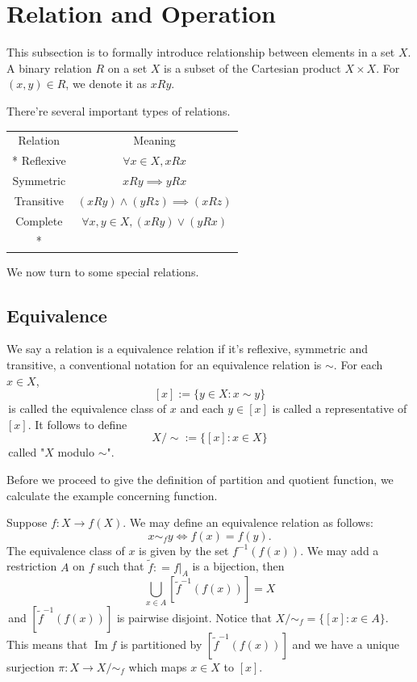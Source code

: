 \section{Relation and Operation}
This subsection is to formally introduce relationship between elements in a set $X$. A binary relation $R$ on a set $X$ is a subset of the Cartesian product $X\times X$. 
For $(x,y) \in R$, we denote it as $xRy$.

There're several important types of relations.
\begin{longtable}[c]{@{}cc@{}}
\toprule
Relation   & Meaning                             \\* \midrule
\endfirsthead
%
\endhead
%
\bottomrule
\endfoot
%
\endlastfoot
%
Reflexive  & $\forall x \in X, xRx$                \\
Symmetric  & $xRy \implies yRx$                    \\
Transitive & $(xRy) \land (yRz) \implies (xRz)$    \\
Complete   & $\forall x,y \in X, (xRy) \lor (yRx)$ \\* \bottomrule
\end{longtable}

We now turn to some special relations.
\subsection{Equivalence}
We say a relation is a equivalence relation if it's reflexive, symmetric and transitive, a conventional notation for an equivalence relation is $\sim$.
For each $x\in X$, $$[x] := \{y\in X : x\sim y\}$$
\,is called the equivalence class of $x$ and each $y \in [x]$ is called a representative of $[x]$. It follows to define 
$$X/\sim := \{[x] : x\in X\}$$
\,called "$X$ modulo $\sim$".

Before we proceed to give the definition of partition and quotient function, we calculate the example concerning function.
\begin{example}
    Suppose $f:X\to f(X)$. We may define an equivalence relation as follows:
    $$x\sim_{f} y \iff f(x) = f(y).$$
    The equivalence class of $x$ is given by the set $f^{-1}(f(x))$. We may add a restriction $A$ on $f$ such that $\tilde{f}: =f|_{A}$ is a bijection, then
    $$\bigcup_{x\in A} [\tilde{f}^{-1} (f(x))] = X$$
    \,and $[\tilde{f}^{-1} (f(x))]$ is pairwise disjoint. Notice that 
    $X/\sim_{f} = \{[x] : x\in A\}$. This means that $\operatorname{Im} f$ is partitioned by $[\tilde{f}^{-1} (f(x))]$ and we have a unique surjection
    $\pi: X \to X/\sim_{f}$ which maps $x\in X$ to $[x]$. 
\end{example}

